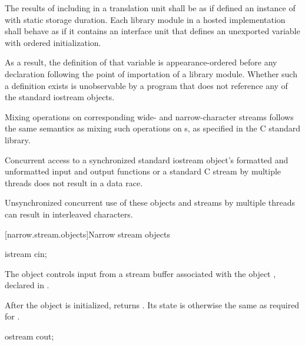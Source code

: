 \pnum
The results of including  in a translation unit shall be as if
 defined an instance of  with static
storage duration.
Each \Cpp{} library module in a hosted implementation
shall behave as if it contains an interface unit that
defines an unexported  variable with
ordered initialization.

\begin{note}
As a result, the definition of that variable is appearance-ordered before
any declaration following the point of importation of a \Cpp{} library module.
Whether such a definition exists is unobservable by a program that
does not reference any of the standard iostream objects.
\end{note}

\pnum
Mixing operations on corresponding wide- and narrow-character streams
follows the same semantics as mixing such operations on
s,
as specified in the C standard library.

\pnum
Concurrent access to a synchronized standard iostream object's formatted and unformatted input and output functions or a standard C stream by multiple threads does not result in a data race.
\begin{note}
Unsynchronized concurrent use of these objects and streams by multiple threads
can result in interleaved characters.
\end{note}


[narrow.stream.objects]{Narrow stream objects}

%
\begin{itemdecl}
istream cin;
\end{itemdecl}

\begin{itemdescr}
\pnum
The object 
controls input from a stream buffer associated with the object ,
declared in .

\pnum
After the object
is initialized,
returns
.
Its state is otherwise the same as required for
.
\end{itemdescr}

%
\begin{itemdecl}
ostream cout;
\end{itemdecl}


